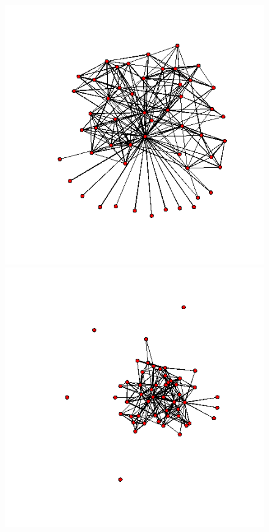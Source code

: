 \documentclass[aspectratio=169,ignorenonframetext,9pt]{beamer}
\theoremstyle{plain}
\theoremstyle{definition}
\begin{document}
\begin{figure}[h]
    \begin{center}
    \includegraphics[scale=0.23]{pictures/m3_19_nework.png}
    \includegraphics[scale=0.23]{pictures/w3_19_nework.png}

\end{center}
\end{figure}
\end{document}
